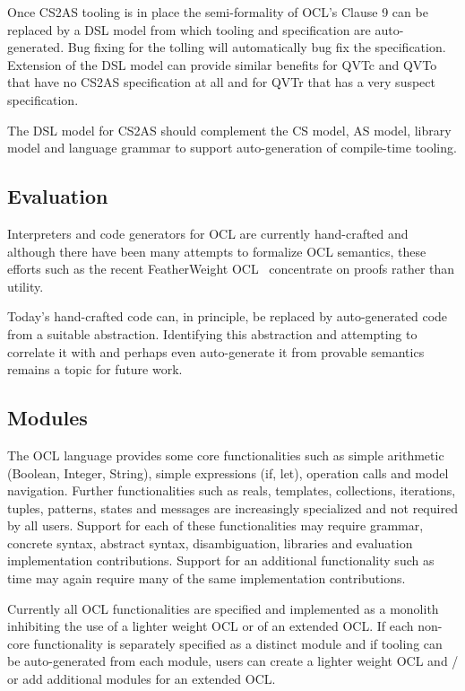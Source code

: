 \documentclass{llncs}
\begin{document}
Once CS2AS tooling is in place the semi-formality of OCL's Clause 9 can be replaced by a DSL model from which tooling and specification are auto-generated. Bug fixing for the tolling will automatically bug fix the specification. Extension of the DSL model can provide similar benefits for QVTc and QVTo that have no CS2AS specification at all and for QVTr that has a very suspect specification.

The DSL model for CS2AS should complement the CS model, AS model, library model and language grammar to support auto-generation of compile-time tooling.

\subsection{Evaluation}

Interpreters and code generators for OCL are currently hand-crafted and although there have been many attempts to formalize OCL semantics, these efforts such as the recent FeatherWeight OCL~\cite{FeatherweightOCL} concentrate on proofs rather than utility.

Today's hand-crafted code can, in principle, be replaced by auto-generated code from a suitable abstraction. Identifying this abstraction and attempting to correlate it with and perhaps even auto-generate it from provable semantics remains a topic for future work.

\subsection{Modules}

The OCL language provides some core functionalities such as simple arithmetic (Boolean, Integer, String), simple expressions (if, let), operation calls and model navigation. Further functionalities such as reals, templates, collections, iterations, tuples, patterns, states and messages are increasingly specialized and not required by all users. Support for each of these functionalities may require grammar, concrete syntax, abstract syntax, disambiguation, libraries and evaluation implementation contributions. Support for an additional functionality such as time may again require many of the same implementation contributions.

Currently all OCL functionalities are specified and implemented as a monolith inhibiting the use of a lighter weight OCL or of an extended OCL. If each non-core functionality is separately specified as a distinct module and if tooling can be auto-generated from each module, users can create a lighter weight OCL and / or add additional modules for an extended OCL.
\end{document}
